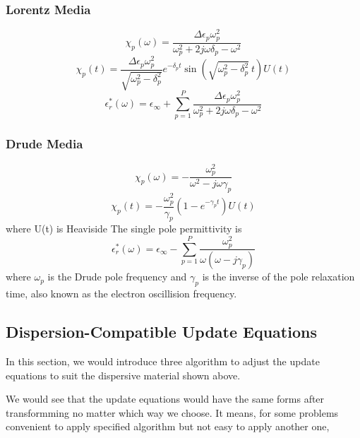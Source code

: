 \subsubsection{Lorentz Media}
\begin{equation}
  \chi_p(\omega) = \frac{\Delta\epsilon_p\omega_p^2}{\omega_p^2 + 2j\omega\delta_p - \omega^2}  
\end{equation}
\begin{equation}
  \chi_p(t) = \frac{\Delta \epsilon_p \omega_p^2}{\sqrt{\omega_p^2 - \delta_p^2}}e^{-\delta_p t}\sin\left(\sqrt{\omega_p^2-\delta_p^2}\ t\right)U(t)
\end{equation}
\begin{equation}
  \epsilon_r^*(\omega) = \epsilon_{\infty} + \sum_{p=1}^P \frac{\Delta\epsilon_p\omega_p^2}{\omega_p^2 + 2j\omega\delta_p - \omega^2}  
\end{equation}


\subsubsection{Drude Media}
\begin{equation}
  \chi_p(\omega) = -\frac{\omega_p^2}{\omega^2 - j\omega\gamma_p}  
\end{equation}
\begin{equation}
  \chi_p(t) = -\frac{\omega_p^2}{\gamma_p}\left(1-e^{-\gamma_p t}\right) U(t)
\end{equation}
where U(t) is Heaviside
The single pole permittivity is 
\begin{equation}
  \epsilon_r^*(\omega) = \epsilon_{\infty} - \sum_{p=1}^P \frac{\omega_p^2}{\omega(\omega-j\gamma_p)}
\end{equation}
where $\omega_p$ is the Drude pole frequency and $\gamma_p$ is the inverse of the pole relaxation time, also known as the
electron oscillision frequency.



\subsection{Dispersion-Compatible Update Equations}
In this section, we would introduce three algorithm to adjust the update equations to suit the dispersive material shown
above.

We would see that the update equations would have the same forms after transformming no matter which way we choose. It
means, for some problems convenient to apply specified algorithm but not easy to apply another one, 

